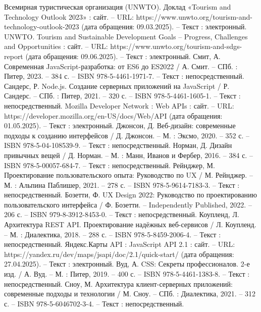 
\begin{thebibliography}{21}

     Всемирная туристическая организация (UNWTO). Доклад «Tourism and Technology Outlook 2023» : сайт. – URL: https://www.unwto.org/tourism-and-technology-outlook-2023 (дата обращения: 09.03.2025). – Текст : электронный.
   		UNWTO. Tourism and Sustainable Development Goals – Progress, Challenges and Opportunities : сайт. – URL: https://www.unwto.org/tourism-and-sdgs-report (дата обращения: 09.06.2025). – Текст : электронный.
   		Смит, А. Современная JavaScript-разработка: от ES6 до ES2022 / А. Смит. – СПб. : Питер, 2023. – 384 с. – ISBN 978-5-4461-1971-7. – Текст : непосредственный.
    	Сандерс, Р. Node.js. Создание серверных приложений на JavaScript / Р. Сандерс. – СПб. : Питер, 2021. – 320 с. – ISBN 978-5-4461-1605-1. – Текст : непосредственный.
   		Mozilla Developer Network : Web APIs : сайт. – URL: https://developer.mozilla.org/en-US/docs/Web/API (дата обращения: 01.05.2025). – Текст : электронный.
		Джонсон, Д. Веб-дизайн: современные подходы к созданию интерфейсов / Д. Джонсон. – М. : Эксмо, 2020. – 352 с. – ISBN 978-5-04-108539-9. – Текст : непосредственный.
	 Норман, Д. Дизайн привычных вещей / Д. Норман. – М. : Манн, Иванов и Фербер, 2016. – 384 с. – ISBN 978-5-00057-684-7. – Текст : непосредственный.
   		Рейнджер, М. Проектирование пользовательского опыта: Руководство по UX / М. Рейнджер. – М. : Альпина Паблишер, 2021. – 278 с. – ISBN 978-5-9614-7183-3. – Текст : непосредственный.    
	 Бозетти, Ф. UX Design 2022: Руководство по проектированию пользовательского интерфейса / Ф. Бозетти. – Independently Published, 2022. – 206 с. – ISBN 979-8-3912-8453-0. – Текст : непосредственный.
		Коупленд, Л. Архитектура REST API. Проектирование надёжных веб-сервисов / Л. Коупленд. – М. : Диалектика, 2018. – 288 с. – ISBN 978-5-8459-2006-4. – Текст : непосредственный.
 	 Яндекс.Карты API : JavaScript API 2.1 : сайт. – URL: https://yandex.ru/dev/maps/jsapi/doc/2.1/quick-start/ (дата обращения: 27.04.2025). – Текст : электронный.
 		Вуд, А. CSS: Секреты профессионалов. 2-е изд. / А. Вуд. – М. : Питер, 2019. – 400 с. – ISBN 978-5-4461-1383-8. – Текст : непосредственный.
 	 Сноу, М. Архитектура клиент-серверных приложений: современные подходы и технологии / М. Сноу. – СПб. : Диалектика, 2021. – 312 с. – ISBN 978-5-6046702-3-4. – Текст : непосредственный.	

\end{thebibliography}
